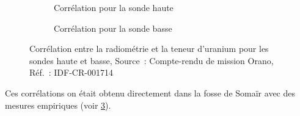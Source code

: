 \begin{figure}
    \centering
    \begin{subfigure}{0.45\textwidth}
        \centering
        \caption{Corrélation pour la sonde haute}
        \label{fig_correlation_sonde_haute}
    \end{subfigure}
    \begin{subfigure}{0.45\textwidth}
        \centering
        \caption{Corrélation pour la sonde basse}
        \label{fig_correlation_sonde_basse}
    \end{subfigure}
    \caption[Corrélation entre la radiométrie et la teneur d'uranium]{Corrélation entre la radiométrie et la teneur d'uranium pour les sondes haute et basse, Source~: Compte-rendu de mission Orano, Réf.~: IDF-CR-001714}
    \label{fig_correlation_sonde}
\end{figure}
Ces corrélations on était obtenu directement dans la fosse de Somaïr avec des mesures empiriques (voir \cref{fig_correlation_sonde}).

